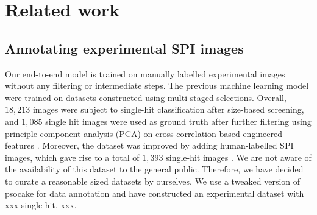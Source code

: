 \section{Related work}



\subsection{Annotating experimental SPI images}


Our end-to-end model is trained on manually labelled experimental images without
any filtering or intermediate steps.  The previous machine learning model
\cite{ignatenkoClassificationDiffractionPatterns2021} were trained on datasets
constructed using multi-staged selections. Overall, $18,213$ images were subject
to single-hit classification after size-based screening, and $1,085$ single hit
images were used as ground truth after further filtering using principle
component analysis (PCA) on cross-correlation-based engineered features
\cite{roseSingleparticleImagingSymmetry2018}. Moreover, the dataset was improved
by adding human-labelled SPI images, which gave rise to a total of $1,393$
single-hit images \cite{liDiffractionDataAerosolized2020a}.  We are not aware of
the availability of this dataset to the general public.  Therefore, we have
decided to curate a reasonable sized datasets by ourselves. We use a tweaked
version of psocake for data annotation and have constructed an experimental
dataset with {\color{red}xxx} single-hit, {\color{red}xxx}.  


